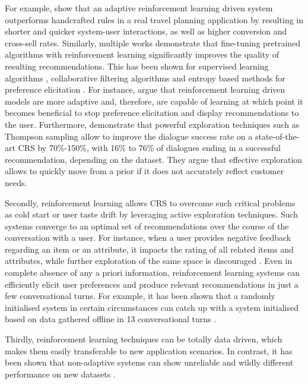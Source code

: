 For example, \cite{mahmood2009improving} show that an adaptive reinforcement learning driven system outperforms handcrafted rules in a real travel planning application by resulting in shorter and quicker system-user interactions, as well as higher conversion and cross-sell rates. Similarly, multiple works demonstrate that fine-tuning pretrained algorithms with reinforcement learning significantly improves the quality of resulting recommendations. This has been shown for supervised learning algorithms \citep{henderson2008hybrid}, collaborative filtering algorithms \citep{sun2018conversational, li2021seamlessly, lei2020estimation} and entropy based methods for preference elicitation \citep{sun2018conversational}. For instance, \cite{sun2018conversational} argue that reinforcement learning driven models are more adaptive and, therefore, are capable of learning at which point it becomes beneficial to stop preference elicitation and display recommendations to the user. Furthermore, \cite{li2021seamlessly} demonstrate that powerful exploration techniques such as Thompson sampling allow to improve the dialogue success rate on a state-of-the-art CRS \citep{lei2020estimation} by 70\%-150\%, with 16\% to 76\% of dialogues ending in a successful recommendation, depending on the dataset. They argue that effective exploration allows to quickly move from a prior if it does not accurately reflect customer needs.

Secondly, reinforcement learning allows CRS to overcome such critical problems as cold start or user taste drift \citep{vendrov2020gradient} by leveraging active exploration techniques. Such systems converge to an optimal set of recommendations over the course of the conversation with a user. For instance, when a user provides negative feedback regarding an item or an attribute, it impacts the rating of all related items and attributes, while further exploration of the same space is discouraged \citep{li2021seamlessly}. Even in complete absence of any a priori information, reinforcement learning systems can efficiently elicit user preferences and produce relevant recommendations in just a few conversational turns. For example, it has been shown that a randomly initialised system in certain circumstances can catch up with a system initialised based on data gathered offline in 13 conversational turns \citep{christakopoulou2016towards}. 

Thirdly, reinforcement learning techniques can be totally data driven, which makes them easily transferable to new application scenarios. In contrast, it has been shown that non-adaptive systems can show unreliable and wildly different performance on new datasets \citep{li2021seamlessly}.


